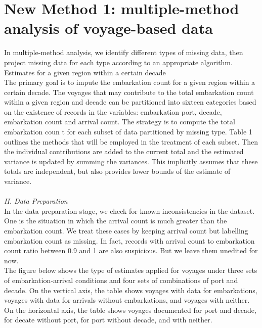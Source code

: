 \documentclass[preprint,12pt]{elsarticle}
\begin{document}
\section{New Method 1: multiple-method analysis of voyage-based data}

In multiple-method analysis, we identify different types of missing data, then project missing data for each type according to an appropriate algorithm. Estimates for a given region within a certain decade\\ 

The primary goal is to impute the embarkation count for a given region within a certain decade.
The voyages that may contribute to the total embarkation count within a given region and decade 
can be partitioned into sixteen categories based on the existence of records in the variables:
embarkation port, decade, embarkation count and arrival count. The strategy is to compute the total embarkation coun  t for each subset of data partitioned by missing type. Table 1 outlines the methods that will be employed in the treatment of each subset. Then the individual contributions are added to the current total and the estimated variance is updated by summing the variances. This implicitly assumes that these totals are independent, but also provides lower bounds of the estimate of variance. \\ 
\\
\textit{II. Data Preparation}\\
\indent
In the data preparation stage, we check for known inconsistencies  in the dataset.
One is the situation in which the arrival count is much greater than the embarkation count.
We treat these cases  by keeping arrival count  but labelling   embarkation count  as missing.
In fact, records with  arrival count  to embarkation count ratio between 0.9 and 1 are also
suspicious. But we leave them unedited for now.\\

\indent 
The figure below 
shows the type of estimates applied for voyages under three sets of embarkation-arrival conditions and four sets of combinations of port and decade. On the vertical axis, the table shows voyages with data for embarkations, voyages with data for arrivals without embarkations, and voyages with neither. On the horizontal axis, the table shows voyages documented for port and decade, for decate without port, for port without decade, and with neither.\\
\end{document}

